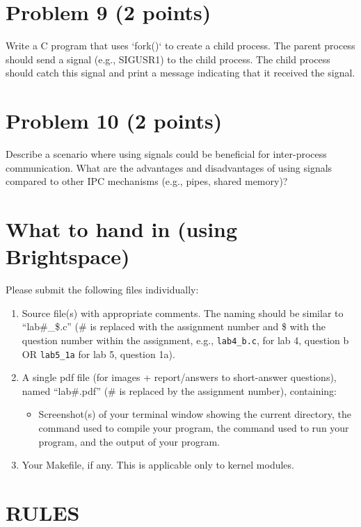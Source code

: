 \documentclass{article}
\begin{document}
\section*{Problem 9 (2 points)}

Write a C program that uses `fork()` to create a child process. The parent process should send a signal (e.g., SIGUSR1) to the child process. The child process should catch this signal and print a message indicating that it received the signal.


\section*{Problem 10 (2 points)}

Describe a scenario where using signals could be beneficial for inter-process communication.  What are the advantages and disadvantages of using signals compared to other IPC mechanisms (e.g., pipes, shared memory)?


\section*{What to hand in (using Brightspace)}

Please submit the following files individually:

\begin{enumerate}
    \item Source file(s) with appropriate comments. The naming should be similar to “lab\#\_\$.c” (\# is replaced with the assignment number and \$ with the question number within the assignment, e.g., \texttt{lab4\_b.c}, for lab 4, question b OR \texttt{lab5\_1a} for lab 5, question 1a).
    \item A single pdf file (for images + report/answers to short-answer questions), named “lab\#.pdf” (\# is replaced by the assignment number), containing:
    \begin{itemize}
        \item Screenshot(s) of your terminal window showing the current directory, the command used to compile your program, the command used to run your program, and the output of your program.
    \end{itemize}
    \item Your Makefile, if any. This is applicable only to kernel modules.
\end{enumerate}


\section*{RULES}
\end{document}
